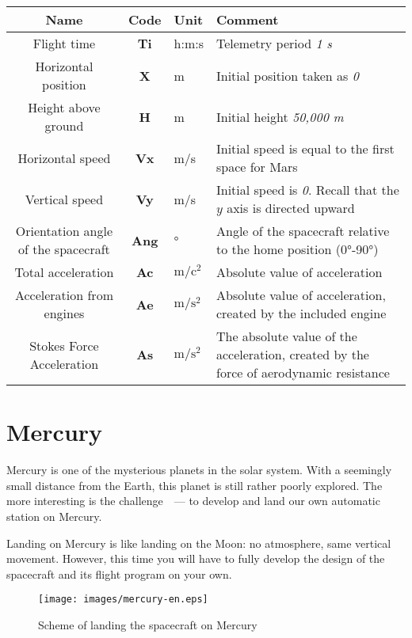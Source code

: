 \documentclass[12pt,a4paper]{article}
\begin{document}
\begin{center}
\begin{tabular}{ |c|c|p{2.5cm}|p{6cm}| }
  \hline
  \textbf{Name} & \textbf{Code} & \textbf{Unit} & \textbf{Comment} \\
   \hline
   Flight time & \textbf{Ti} & h:m:s & Telemetry period \emph{1 s}\\
   \hline
   Horizontal position & \textbf{X} & m & Initial position taken as \emph{0}\\
   \hline
   Height above ground & \textbf{H} & m & Initial height \emph{50,000 m}\\
   \hline
   Horizontal speed & \textbf{Vx} & m/s & Initial speed is equal to the first
   space for Mars\\
   \hline
   Vertical speed & \textbf{Vy} & m/s & Initial speed is
   \emph{0}. Recall that the $y$ axis is directed upward\\
   \hline
   Orientation angle of the spacecraft & \textbf{Ang} & ° & Angle of the spacecraft relative to the home position (0°-90°)\\
   \hline
   Total acceleration & \textbf{Ac} & $\text{m}/\text{c}^{2}$ & Absolute value of acceleration\\
   \hline
   Acceleration from engines & \textbf{Ae} & $\text{m}/\text{s}^{2}$ & Absolute value of acceleration,
   created by the included engine\\
   \hline
   Stokes Force Acceleration & \textbf{As} & $\text{m}/\text{s}^{2}$ & The absolute value of the acceleration,
   created by the force of aerodynamic resistance\\
  \hline
\end{tabular}
\end{center}

\section{Mercury}

Mercury is one of the mysterious planets in the solar system. With a seemingly small distance from the Earth, this planet is still rather poorly explored. The more interesting is the challenge~~--- to develop and land our own automatic station on Mercury.

Landing on Mercury is like landing on the Moon: no atmosphere, same vertical movement. However, this time you will have to fully develop the design of the spacecraft and its flight program on your own.

\begin{figure}[tbh]
  \begin{center}
    \texttt{[image: images/mercury-en.eps]}
    \caption{Scheme of landing the spacecraft on Mercury}
    \label{Pic:mercury}
  \end{center}
\end{figure}
\end{document}

